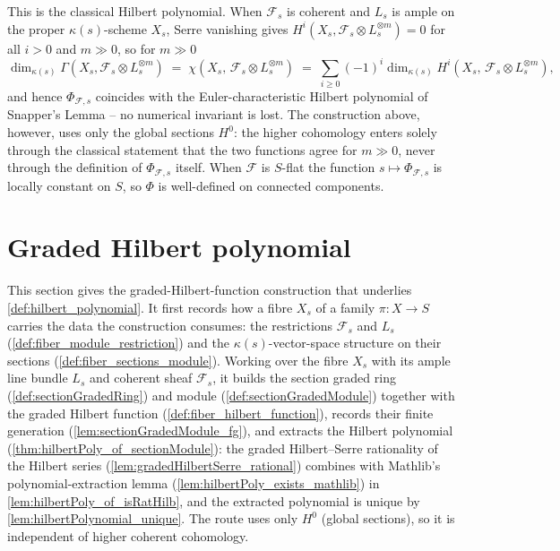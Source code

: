 \begin{definition}
  This is the classical Hilbert polynomial. When \(\mathcal{F}_s\) is coherent
  and \(L_s\) is ample on the proper \(\kappa(s)\)-scheme \(X_s\), Serre vanishing
  gives \(H^i(X_s, \mathcal{F}_s \otimes L_s^{\otimes m}) = 0\) for all \(i > 0\)
  and \(m \gg 0\), so for \(m \gg 0\)
  \[
    \dim_{\kappa(s)} \Gamma(X_s, \mathcal{F}_s \otimes L_s^{\otimes m})
    \;=\; \chi(X_s,\, \mathcal{F}_s \otimes L_s^{\otimes m})
    \;=\; \sum_{i \ge 0} (-1)^i \dim_{\kappa(s)} H^i(X_s,\, \mathcal{F}_s \otimes L_s^{\otimes m}),
  \]
  and hence \(\Phi_{\mathcal{F},s}\) coincides with the Euler-characteristic
  Hilbert polynomial of Snapper's Lemma -- no numerical invariant is lost. The
  construction above, however, uses only the global sections \(H^0\): the higher
  cohomology enters solely through the classical statement that the two functions
  agree for \(m \gg 0\), never through the definition of \(\Phi_{\mathcal{F},s}\)
  itself. When \(\mathcal{F}\) is \(S\)-flat the function
  \(s \mapsto \Phi_{\mathcal{F},s}\) is locally constant on \(S\), so \(\Phi\) is
  well-defined on connected components.
\end{definition}

\section{Graded Hilbert polynomial}
\label{sec:graded_hilbert_polynomial}

This section gives the graded-Hilbert-function construction that underlies
\cref{def:hilbert_polynomial}. It first records how a fibre \(X_s\) of a
family \(\pi : X \to S\) carries the data the construction consumes: the
restrictions \(\mathcal{F}_s\) and \(L_s\)
(\cref{def:fiber_module_restriction}) and the \(\kappa(s)\)-vector-space
structure on their sections (\cref{def:fiber_sections_module}). Working over
the fibre \(X_s\) with its ample line bundle \(L_s\) and coherent sheaf
\(\mathcal{F}_s\), it builds the section graded ring
(\cref{def:sectionGradedRing}) and module (\cref{def:sectionGradedModule})
together with the graded Hilbert function
(\cref{def:fiber_hilbert_function}), records their finite generation
(\cref{lem:sectionGradedModule_fg}), and extracts the Hilbert polynomial
(\cref{thm:hilbertPoly_of_sectionModule}): the graded Hilbert--Serre
rationality of the Hilbert series (\cref{lem:gradedHilbertSerre_rational})
combines with Mathlib's polynomial-extraction lemma
(\cref{lem:hilbertPoly_exists_mathlib}) in \cref{lem:hilbertPoly_of_isRatHilb},
and the extracted polynomial is unique by
\cref{lem:hilbertPolynomial_unique}. The route uses only \(H^0\)
(global sections), so it is independent of higher coherent cohomology.


